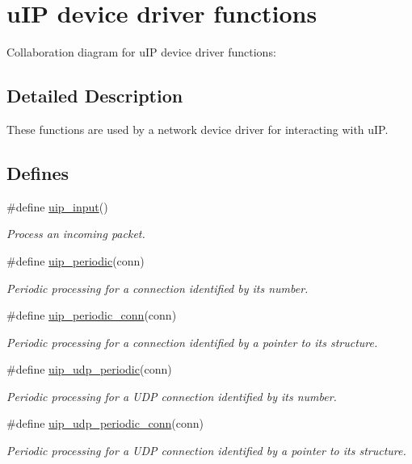 \hypertarget{a00063}{
\section{u\-IP device driver functions}
\label{a00063}
}


Collaboration diagram for u\-IP device driver functions:

\subsection{Detailed Description}
These functions are used by a network device driver for interacting with u\-IP. 



\subsection*{Defines}
\begin{CompactItemize}
\item 
\#define \hyperlink{a00063_ga4360412ee9350fba725f98a137169fe}{uip\_\-input}()
\begin{CompactList}\small\item\em Process an incoming packet. \item\end{CompactList}\item 
\#define \hyperlink{a00063_g1024f8a5fa65e82bf848b2e6590d9628}{uip\_\-periodic}(conn)
\begin{CompactList}\small\item\em Periodic processing for a connection identified by its number. \item\end{CompactList}\item 
\#define \hyperlink{a00063_gbaf0bb2b6a4424b4eb69e45e457c2583}{uip\_\-periodic\_\-conn}(conn)
\begin{CompactList}\small\item\em Periodic processing for a connection identified by a pointer to its structure. \item\end{CompactList}\item 
\#define \hyperlink{a00063_g2c64c8c36bc84f9336f6a2184ea51883}{uip\_\-udp\_\-periodic}(conn)
\begin{CompactList}\small\item\em Periodic processing for a UDP connection identified by its number. \item\end{CompactList}\item 
\#define \hyperlink{a00063_gf5c2ad5acf3cc23b8262e9ba6a15136b}{uip\_\-udp\_\-periodic\_\-conn}(conn)
\begin{CompactList}\small\item\em Periodic processing for a UDP connection identified by a pointer to its structure. \item\end{CompactList}\end{CompactItemize}

